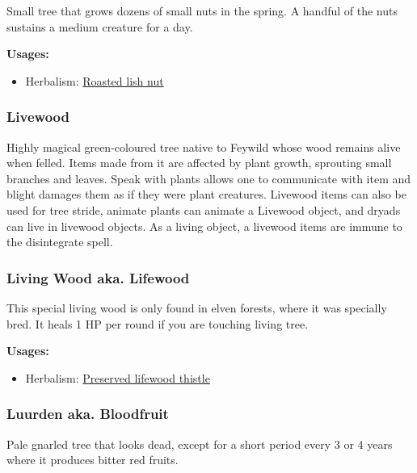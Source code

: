 Small tree that grows dozens of small nuts in the spring. A handful of the nuts sustains a medium creature for a day.

\vspace{5mm}

\textbf{Usages:}

\begin{itemize}[noitemsep]
\item[] Herbalism: \hyperref[Roasted lish nut]{Roasted lish nut}
\end{itemize}

\subsubsection{Livewood}
\label{Livewood}

Highly magical green-coloured tree native to Feywild whose wood remains alive when felled. Items made from it are affected by plant growth, sprouting small branches and leaves. Speak with plants allows one to communicate with item and blight damages them as if they were plant creatures. Livewood items can also be used for tree stride, animate plants can animate a Livewood object, and dryads can live in livewood objects. As a living object, a livewood items are immune to the disintegrate spell.

\subsubsection{Living Wood aka. Lifewood}
\label{Lifewood}

This special living wood is only found in elven forests, where it was specially bred. It heals 1 HP per round if you are touching living tree.

\vspace{5mm}

\textbf{Usages:}

\begin{itemize}[noitemsep]
\item[] Herbalism: \hyperref[Preserved lifewood thistle]{Preserved lifewood thistle}
\end{itemize}

\subsubsection{Luurden aka. Bloodfruit}
\label{Luurden}

Pale gnarled tree that looks dead, except for a short period every 3 or 4 years where it produces bitter red fruits.

